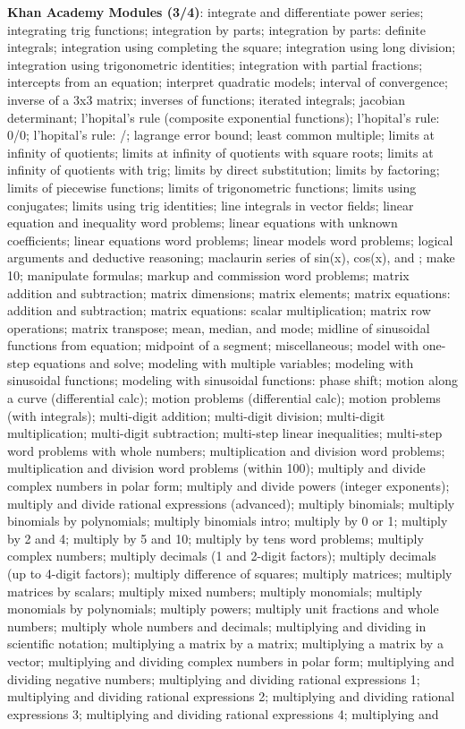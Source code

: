\documentclass{article}
\begin{document}
\begin{figure*}
\textbf{Khan Academy Modules (3/4)}:
integrate and differentiate power series; integrating trig functions; integration by parts; integration by parts: definite integrals; integration using completing the square; integration using long division; integration using trigonometric identities; integration with partial fractions; intercepts from an equation; interpret quadratic models; interval of convergence; inverse of a 3x3 matrix; inverses of functions; iterated integrals; jacobian determinant; l'hopital's rule (composite exponential functions); l'hopital's rule: 0/0; l'hopital's rule: /; lagrange error bound; least common multiple; limits at infinity of quotients; limits at infinity of quotients with square roots; limits at infinity of quotients with trig; limits by direct substitution; limits by factoring; limits of piecewise functions; limits of trigonometric functions; limits using conjugates; limits using trig identities; line integrals in vector fields; linear equation and inequality word problems; linear equations with unknown coefficients; linear equations word problems; linear models word problems; logical arguments and deductive reasoning; maclaurin series of sin(x), cos(x), and ; make 10; manipulate formulas; markup and commission word problems; matrix addition and subtraction; matrix dimensions; matrix elements; matrix equations: addition and subtraction; matrix equations: scalar multiplication; matrix row operations; matrix transpose; mean, median, and mode; midline of sinusoidal functions from equation; midpoint of a segment; miscellaneous; model with one-step equations and solve; modeling with multiple variables; modeling with sinusoidal functions; modeling with sinusoidal functions: phase shift; motion along a curve (differential calc); motion problems (differential calc); motion problems (with integrals); multi-digit addition; multi-digit division; multi-digit multiplication; multi-digit subtraction; multi-step linear inequalities; multi-step word problems with whole numbers; multiplication and division word problems; multiplication and division word problems (within 100); multiply and divide complex numbers in polar form; multiply and divide powers (integer exponents); multiply and divide rational expressions (advanced); multiply binomials; multiply binomials by polynomials; multiply binomials intro; multiply by 0 or 1; multiply by 2 and 4; multiply by 5 and 10; multiply by tens word problems; multiply complex numbers; multiply decimals (1 and 2-digit factors); multiply decimals (up to 4-digit factors); multiply difference of squares; multiply matrices; multiply matrices by scalars; multiply mixed numbers; multiply monomials; multiply monomials by polynomials; multiply powers; multiply unit fractions and whole numbers; multiply whole numbers and decimals; multiplying and dividing in scientific notation; multiplying a matrix by a matrix; multiplying a matrix by a vector; multiplying and dividing complex numbers in polar form; multiplying and dividing negative numbers; multiplying and dividing rational expressions  1; multiplying and dividing rational expressions 2; multiplying and dividing rational expressions 3; multiplying and dividing rational expressions 4; multiplying and 
\end{figure*}
\end{document}

